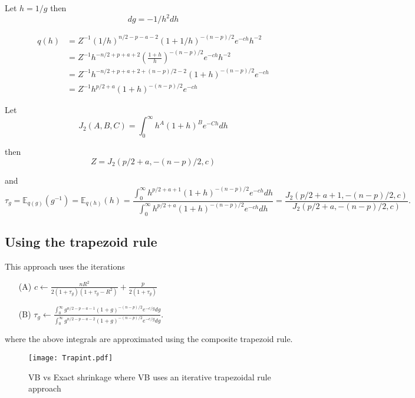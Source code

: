 \documentclass{article}
\def\bE{{\mathbb E}}                             %
\def\ds{\displaystyle}
\begin{document}
\noindent Let $h = 1/g$ then
$$
dg = -1/h^2 dh
$$

$$
\begin{array}{rl}
\ds q(h) 
    & \ds = Z^{-1}  (1/h)^{n/2 - p - a - 2}(1 + 1/h)^{-(n-p)/2}e^{-ch} h^{-2}
    \\
	& \ds = Z^{-1}  h^{-n/2 + p + a + 2}\left( \frac{1 +h}{h}\right)^{-(n-p)/2}e^{-ch} h^{-2}
	\\
	& \ds = Z^{-1}  h^{-n/2 + p + a + 2 + (n-p)/2 - 2}(1 + h)^{-(n-p)/2}e^{-ch} 
	\\
	& \ds = Z^{-1}  h^{p/2 + a}(1 + h)^{-(n-p)/2}e^{-ch} 
\end{array}
$$

\noindent Let 
$$
J_2(A,B,C) = \int_0^\infty h^A(1 + h)^{B}e^{-Ch} dh 
$$

\noindent then
$$
Z = J_2(p/2 + a,-(n-p)/2,c)
$$

\noindent and
$$
\tau_g = \bE_{q(g)}(g^{-1}) = \bE_{q(h)}(h) = \frac{\ds \int_0^\infty h^{p/2 + a +1}(1 + h)^{-(n-p)/2}e^{-ch}  dh}{\ds 
	\int_0^\infty h^{p/2 + a}(1 + h)^{-(n-p)/2}e^{-ch}  dh} 
= \frac{J_2(p/2 + a+1,-(n-p)/2,c)}{J_2(p/2 + a,-(n-p)/2,c)}.
$$

\subsection{Using the trapezoid rule}

This approach uses the iterations

\begin{enumerate}
	\item[(A)] $\ds c \leftarrow \frac{nR^2}{2( 1 + \tau_g)( 1 + \tau_g
		-   R^2)} + \frac{p}{2(1 + \tau_g)}$
	
	\item[(B)] $\tau_g \leftarrow \frac{\ds \int_0^\infty g^{n/2 - p - a - 1}(1 + g)^{-(n-p)/2}e^{-c/g} dg}{
		\ds \int_0^\infty g^{n/2 - p - a - 2}(1 + g)^{-(n-p)/2}e^{-c/g} dg} $.
\end{enumerate}

\noindent where the above integrals are approximated using the 
composite trapezoid rule.

\begin{figure}[ht]
	\centering
	\texttt{[image: Trapint.pdf]}
	\caption{VB vs Exact shrinkage where VB uses an iterative trapezoidal rule approach}
	\label{fig:01}
\end{figure}
\end{document}
